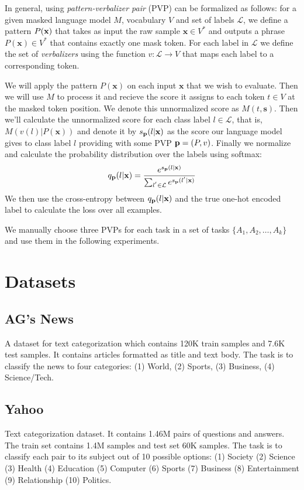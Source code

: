 \documentclass[11pt,a4paper]{article}
\begin{document}
In general, using \textit{pattern-verbalizer pair} (PVP) can be formalized as follows: for a given masked language model $M$, vocabulary $V$ and set of labels $\mathcal{L}$, we define a pattern $P(\textbf{\text{x}})$ that takes as input the raw sample $\textbf{x}\in{}V^*$ and outputs a phrase $P(\textbf{x})\in{}V^*$ that contains exactly one mask token.
For each label in $\mathcal{L}$ we define the set of \textit{verbalizers} using the function $v:\mathcal{L}\rightarrow{}V$ that maps each label to a corresponding token.

We will apply the pattern $P(\textbf{x})$ on each input $\textbf{x}$ that we wish to evaluate.
Then we will use $M$ to process it and recieve the score it assigns to each token $t\in{}V$ at the masked token position.
We denote this unnormalized score as $M(t, \textbf{s})$.
Then we'll calculate the unnormalized score for each class label $l\in{}\mathcal{L}$, that is, $M(v(l) | P(\textbf{x}))$ and denote it by $s_{\text{\textbf{p}}}(l|\textbf{x})$ as the score our language model gives to class label $l$ providing with some PVP $\text{\textbf{p}}=(P, v)$.
Finally we normalize and calculate the probability distribution over the labels using softmax:
\[
	q_\text{\textbf{p}}(l|\textbf{x}) = \frac{e^{s_{\text{\textbf{p}}}(l|\textbf{x})}}{\sum_{l^{'}\in{}\mathcal{L}}e^{s_{\text{\textbf{p}}}(l^{'}|\textbf{x})}}
\]
We then use the cross-entropy between $q_\text{\textbf{p}}(l|\textbf{x})$ and the true one-hot encoded label to calculate the loss over all examples. 

We manually choose three PVPs for each task in a set of tasks $\{A_1, A_2, \dots, A_k\}$ and use them in the following experiments.


\section{Datasets}

\subsection{AG's News}
A dataset for text categorization which contains 120K train samples and 7.6K test samples.
It contains articles formatted as title and text body.
The task is to classify the news to four categories: (1) World, (2) Sports, (3) Business, (4) Science/Tech.

\subsection{Yahoo}
Text categorization dataset. It contains 1.46M pairs of questions and answers.
The train set contains 1.4M samples and test set 60K samples.
The task is to classify each pair to its subject out of 10 possible options: (1) Society (2) Science (3) Health (4) Education (5) Computer (6) Sports (7) Business (8) Entertainment (9) Relationship (10) Politics.
\end{document}
